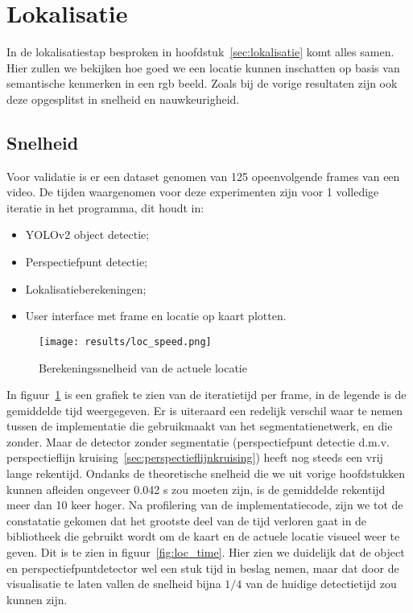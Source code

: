 \section{Lokalisatie}

In de lokalisatiestap besproken in hoofdstuk~\ref{sec:lokalisatie} komt alles samen.
Hier zullen we bekijken hoe goed we een locatie kunnen inschatten op basis van semantische kenmerken in een \gls{rgb} beeld.
Zoals bij de vorige resultaten zijn ook deze opgesplitst in snelheid en nauwkeurigheid.


\subsection{Snelheid}
Voor validatie is er een dataset genomen van 125 opeenvolgende frames van een video.
De tijden waargenomen voor deze experimenten zijn voor 1 volledige iteratie in het programma, dit houdt in:

\begin{itemize}
    \item YOLOv2 object detectie;
    \item Perspectiefpunt detectie;
    \item Lokalisatieberekeningen;
    \item User interface met frame en locatie op kaart plotten.
\end{itemize}

\begin{figure}[h]
    \centering
    \texttt{[image: results/loc\_speed.png]}
    \caption{Berekeningssnelheid van de actuele locatie}
    \label{fig:loc_speed}
\end{figure}

In figuur~\ref{fig:loc_speed} is een grafiek te zien van de iteratietijd per frame, in de legende is de gemiddelde tijd weergegeven.
Er is uiteraard een redelijk verschil waar te nemen tussen de implementatie die gebruikmaakt van het segmentatienetwerk, en die zonder.
Maar de detector zonder segmentatie (perspectiefpunt detectie d.m.v. perspectieflijn kruising~\ref{sec:perspectieflijnkruising}) heeft nog steeds
een vrij lange rekentijd.
Ondanks de theoretische snelheid die we uit vorige hoofdstukken kunnen afleiden ongeveer 0.042 s zou moeten zijn, is de gemiddelde rekentijd meer dan 10 keer hoger.
Na profilering van de implementatiecode, zijn we tot de constatatie gekomen dat het grootste deel van de tijd verloren gaat in de bibliotheek die gebruikt wordt
om de kaart en de actuele locatie visueel weer te geven. Dit is te zien in figuur~\ref{fig:loc_time}.
Hier zien we duidelijk dat de object en perspectiefpuntdetector wel een stuk tijd in beslag nemen, maar dat door de visualisatie te laten vallen
de snelheid bijna $1/4$ van de huidige detectietijd zou kunnen zijn.

